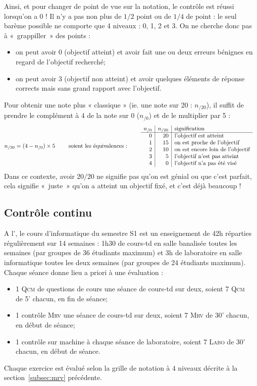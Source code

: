 Ainsi, et pour changer de point de vue sur la notation, le contrôle 
est réussi lorsqu'on a 0 ! Il n'y a pas non plus de $1/2$ point ou de $1/4$ 
de point : le seul barème possible ne comporte que 4 niveaux : 0, 1, 2 et 3.
On ne cherche donc pas à «~grappiller~» des points : 
\begin{itemize}
\item on peut avoir 0 (objectif atteint) et avoir fait une ou deux erreurs 
	bénignes en regard de l'objectif recherché;
\item on peut avoir 3 (objectif non atteint) et avoir quelques éléments de
	réponse corrects mais sans grand rapport avec l'objectif.
\end{itemize}
Pour obtenir une note plus « classique » (ie. une note sur 20 : $n_{/20}$), il suffit
de prendre le complément à 4 de la note sur 0 ($n_{/0}$) et de le multiplier par 5 :
$$n_{/20} = (4 - n_{/0})\times 5\hfill \makebox[5.25cm]{soient les équivalences :}\hfill
\begin{array}{r|r|l}
n_{/0} & n_{/20} & \mbox{signification} \\
\hline
0 & 20 & \mbox{l'objectif est atteint}\\
1 & 15 & \mbox{on est proche de l'objectif}\\
2 & 10 & \mbox{on est encore loin de l'objectif}\\
3 &  5 & \mbox{l'objectif n'est pas atteint}\\
4 &  0 & \mbox{l'objectif n'a pas été visé}
\end{array}$$
Dans ce contexte, avoir $20/20$ ne signifie pas qu'on est génial ou que c'est parfait,
cela signifie «~juste~» qu'on a atteint un objectif fixé, et c'est déjà beaucoup !

\subsection{Contrôle continu}\label{subsec:cc}
A l'\enib, le cours d'informatique du semestre S1 est un enseignement de 42h 
réparties régulièrement sur 14 semaines : 1h30 de cours-td  en salle banalisée 
toutes les semaines (par groupes de 36 étudiants maximum) et 3h de laboratoire 
en salle informatique toutes les deux semaines (par groupes de 24 étudiants maximum). 
Chaque séance donne lieu a priori à une évaluation : 
\begin{itemize}
\item 1 \textsc{Qcm} de questions de cours une séance de cours-td sur deux, 
	soient 7 \textsc{Qcm} de 5' chacun, en fin de séance; 
\item 1 contrôle \textsc{Mrv} une séance de cours-td sur deux,
	soient 7 \textsc{Mrv} de 30' chacun, en début de séance; 
\item 1 contrôle sur machine à chaque séance de laboratoire,
	soient 7 \textsc{Labo} de 30' chacun, en début de séance.
\end{itemize}
Chaque exercice est évalué selon la grille de notation à 4 niveaux décrite à la 
section~\ref{subsec:mrv} précédente.

